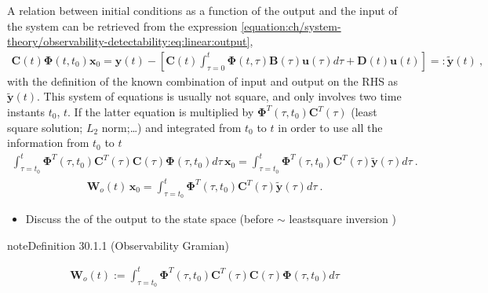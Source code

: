 \documentclass[letterpaper,10pt,english]{jupyterBook}
\begin{document}
\sphinxAtStartPar
A relation between initial conditions as a function of the output and the input of the system can be retrieved from the expression \eqref{equation:ch/system-theory/observability-detectability:eq:linear:output},
\begin{equation*}
\begin{split}\mathbf{C}(t) \boldsymbol\Phi(t,t_0) \mathbf{x}_0 = \mathbf{y}(t) - \left[ \mathbf{C}(t) \int_{\tau=0}^{t} \boldsymbol\Phi(t,\tau) \mathbf{B}(\tau) \mathbf{u}(\tau) d \tau + \mathbf{D}(t) \mathbf{u}(t) \right] =: \widetilde{\mathbf{y}}(t) \ ,\end{split}
\end{equation*}
\sphinxAtStartPar
with the definition of the known combination of input and output on the RHS as \(\widetilde{\mathbf{y}}(t)\).
This system of equations is usually not square, and only involves two time instants \(t_0\), \(t\). If the latter equation is multiplied by \(\boldsymbol\Phi^T(\tau,t_0) \mathbf{C}^T(\tau)\) (least square solution; \(L_2\) norm;…) and integrated from \(t_0\) to \(t\) in order to use all the information from \(t_0\) to \(t\)
\begin{equation*}
\begin{split}\int_{\tau=t_0}^{t} \boldsymbol\Phi^T(\tau,t_0) \mathbf{C}^T(\tau) \mathbf{C}(\tau) \boldsymbol\Phi(\tau,t_0) d \tau \, \mathbf{x}_0 = \int_{\tau=t_0}^{t} \boldsymbol\Phi^T(\tau,t_0) \mathbf{C}^T(\tau) \widetilde{\mathbf{y}}(\tau) d \tau \ .\end{split}
\end{equation*}\begin{equation*}
\begin{split}\mathbf{W}_o(t) \, \mathbf{x}_0 = \int_{\tau=t_0}^{t} \boldsymbol\Phi^T(\tau,t_0) \mathbf{C}^T(\tau) \widetilde{\mathbf{y}}(\tau) d \tau \ .\end{split}
\end{equation*}
\sphinxAtStartPar
{}
\begin{itemize}
\item {} 
\sphinxAtStartPar
Discuss the  of the output to the state space (before \(\sim\) least\sphinxhyphen{}square inversion )

\end{itemize}
\label{ch/system-theory/observability-detectability:def:observability-gramian}
\begin{sphinxadmonition}{note}{Definition 30.1.1 (Observability Gramian)}


\begin{equation}\label{equation:ch/system-theory/observability-detectability:eq:observability-gramian:def}
\begin{split}
\mathbf{W}_o(t) := \int_{\tau=t_0}^{t} \boldsymbol\Phi^T(\tau,t_0) \mathbf{C}^T(\tau) \mathbf{C}(\tau) \boldsymbol\Phi(\tau,t_0) d \tau
\end{split}
\end{equation}\end{sphinxadmonition}
\end{document}
